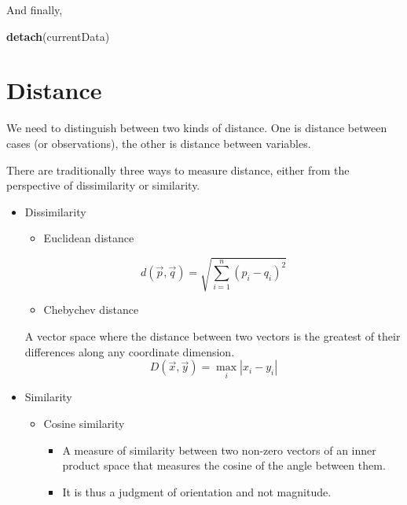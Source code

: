 \documentclass[
]{ctexart}
\newenvironment{Shaded}{\begin{snugshade}}{\end{snugshade}}
\newcommand{\FunctionTok}[1]{\textcolor[rgb]{0.13,0.29,0.53}{\textbf{#1}}}
\newcommand{\NormalTok}[1]{#1}
\providecommand{\tightlist}{%
  \setlength{\itemsep}{0pt}\setlength{\parskip}{0pt}}
\begin{document}
And finally,

\begin{Shaded}
\begin{Highlighting}[]
\FunctionTok{detach}\NormalTok{(currentData)}
\end{Highlighting}
\end{Shaded}

\hypertarget{distance}{%
\section{Distance}\label{distance}}

We need to distinguish between two kinds of distance. One is distance
between cases (or observations), the other is distance between
variables.

There are traditionally three ways to measure distance, either from the
perspective of dissimilarity or similarity.

\begin{itemize}
\tightlist
\item
  Dissimilarity

  \begin{itemize}
  \tightlist
  \item
    Euclidean distance
  \end{itemize}

  \[d(\vec p,\vec q)=\sqrt{\sum_{i=1}^n(p_i-q_i)^2}\]

  \begin{itemize}
  \tightlist
  \item
    Chebychev distance
  \end{itemize}

  A vector space where the distance between two vectors is the greatest
  of their differences along any coordinate dimension.
  \[D(\vec x,\vec y)=\max_i|x_i-y_i|\]
\item
  Similarity

  \begin{itemize}
  \tightlist
  \item
    Cosine similarity

    \begin{itemize}
    \tightlist
    \item
      A measure of similarity between two non-zero vectors of an inner
      product space that measures the cosine of the angle between them.
    \item
      It is thus a judgment of orientation and not magnitude.
    \end{itemize}
  \end{itemize}
\end{itemize}
\end{document}
